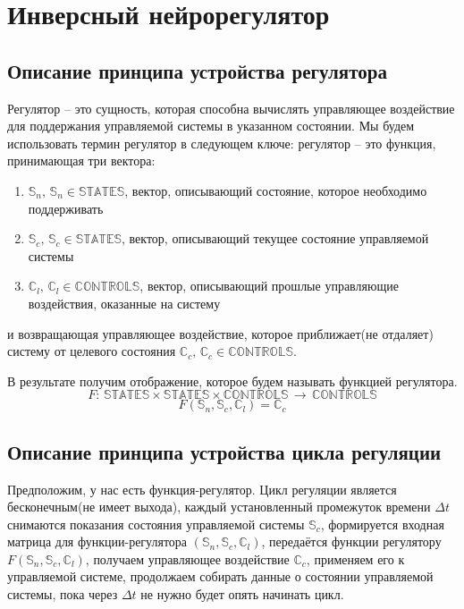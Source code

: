 \documentclass[14pt]{extreport}
\begin{document}
    \chapter{Инверсный нейрорегулятор}
        \section{Описание принципа устройства регулятора}
            Регулятор -- это сущность, которая способна вычислять управляющее воздействие для поддержания управляемой системы в указанном состоянии.
            Мы будем использовать термин регулятор в следующем ключе: регулятор -- это функция, принимающая три вектора:
            {
                \begin{enumerate}
                      \item \(\mathbb{S}_n,\, \mathbb{S}_n \in \mathbb{STATES}\),
                        вектор, описывающий состояние, которое необходимо поддерживать
                      \item \(\mathbb{S}_c,\, \mathbb{S}_c \in \mathbb{STATES}\),
                        вектор, описывающий текущее состояние управляемой системы
                      \item \(\mathbb{C}_l,\, \mathbb{C}_l \in \mathbb{CONTROLS}\),
                        вектор, описывающий прошлые управляющие воздействия, оказанные на систему
                \end{enumerate}
            }
            и возвращающая управляющее воздействие, которое приближает(не отдаляет) систему от целевого состояния \(\mathbb{C}_c,\, \mathbb{C}_c \in \mathbb{CONTROLS}\).

            В результате получим отображение, которое будем называть функцией регулятора.
            \[F:\,\mathbb{STATES}\times\mathbb{STATES}\times\mathbb{CONTROLS}\,\rightarrow\,\mathbb{CONTROLS}\]
            \[F(\mathbb{S}_n,\mathbb{S}_c,\mathbb{C}_l) = \mathbb{C}_c\]

        \section{Описание принципа устройства цикла регуляции}
            Предположим, у нас есть функция-регулятор. Цикл регуляции является бесконечным(не имеет выхода), каждый установленный промежуток времени $\Delta t$ снимаются показания состояния управляемой системы $\mathbb{S}_c$, формируется входная матрица для функции-регулятора $(\mathbb{S}_n,\mathbb{S}_c,\mathbb{C}_l)$, передаётся функции регулятору $F(\mathbb{S}_n,\mathbb{S}_c,\mathbb{C}_l)$, получаем управляющее воздействие $ \mathbb{C}_c$, применяем его к управляемой системе, продолжаем собирать данные о состоянии управляемой системы, пока через $\Delta t$ не нужно будет опять начинать цикл.
\end{document}
